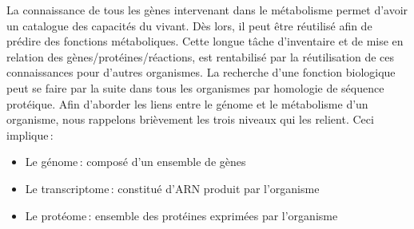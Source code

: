 \begin{refsegment}
    La connaissance de tous les gènes intervenant dans le métabolisme permet d'avoir un catalogue des capacités du vivant. Dès lors, il peut être réutilisé afin de prédire des fonctions métaboliques. Cette longue tâche d'inventaire et de mise en relation des gènes/protéines/réactions, est rentabilisé par la réutilisation de ces connaissances pour d'autres organismes. La recherche d'une fonction biologique peut se faire par la suite dans tous les organismes par homologie de séquence protéique. Afin d'aborder les liens entre le génome et le métabolisme d'un organisme, nous rappelons brièvement les trois niveaux qui les relient. Ceci implique :\nolisttopbreak
    
    \begin{itemize}
        \item Le génome : composé d'un ensemble de gènes
        \item Le transcriptome : constitué d'\gls{ARN} produit par l'organisme
        \item Le protéome : ensemble des protéines exprimées par l'organisme
    \end{itemize}

    

\end{refsegment}
